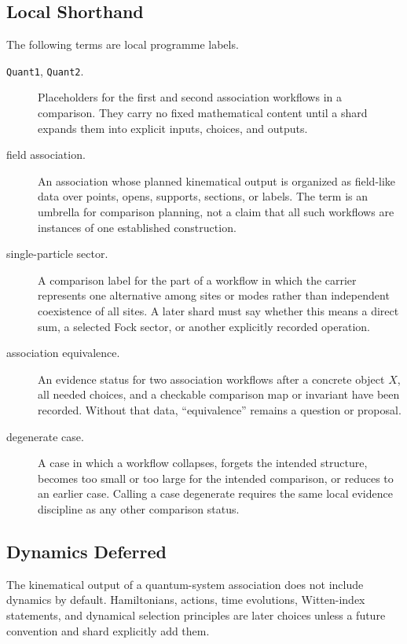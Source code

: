 \subsection{Local Shorthand}

The following terms are local programme labels.

\begin{description}
\item[\texttt{Quant1}, \texttt{Quant2}.]
Placeholders for the first and second association workflows in a comparison.
They carry no fixed mathematical content until a shard expands them into
explicit inputs, choices, and outputs.

\item[field association.]
An association whose planned kinematical output is organized as field-like
data over points, opens, supports, sections, or labels.  The term is an
umbrella for comparison planning, not a claim that all such workflows are
instances of one established construction.

\item[single-particle sector.]
A comparison label for the part of a workflow in which the carrier represents
one alternative among sites or modes rather than independent coexistence of
all sites.  A later shard must say whether this means a direct sum, a selected
Fock sector, or another explicitly recorded operation.

\item[association equivalence.]
An evidence status for two association workflows after a concrete object
\(X\), all needed choices, and a checkable comparison map or invariant have
been recorded.  Without that data, ``equivalence'' remains a question or
proposal.

\item[degenerate case.]
A case in which a workflow collapses, forgets the intended structure, becomes
too small or too large for the intended comparison, or reduces to an earlier
case.  Calling a case degenerate requires the same local evidence discipline
as any other comparison status.
\end{description}

\subsection{Dynamics Deferred}

The kinematical output of a quantum-system association does not include
dynamics by default.  Hamiltonians, actions, time evolutions, Witten-index
statements, and dynamical selection principles are later choices unless a
future convention and shard explicitly add them.

